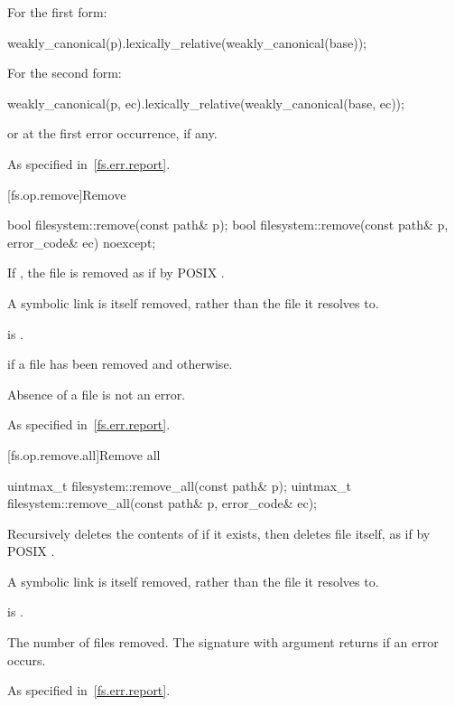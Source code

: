 \begin{itemdescr}
\pnum
\returns
For the first form:
\begin{codeblock}
weakly_canonical(p).lexically_relative(weakly_canonical(base));
\end{codeblock}
  For the second form:
\begin{codeblock}
weakly_canonical(p, ec).lexically_relative(weakly_canonical(base, ec));
\end{codeblock}
  or  at the first error occurrence, if any.

\pnum
\throws
As specified in~\ref{fs.err.report}.
\end{itemdescr}

[fs.op.remove]{Remove}

%
\begin{itemdecl}
bool filesystem::remove(const path& p);
bool filesystem::remove(const path& p, error_code& ec) noexcept;
\end{itemdecl}

\begin{itemdescr}
\pnum
\effects
If , the file  is
  removed as if by POSIX .
\begin{note}
A symbolic link is itself removed, rather than the file it
  resolves to.
\end{note}

\pnum
\ensures
{} is .

\pnum
\returns
{} if a file  has been removed and  otherwise.
\begin{note}
Absence of a file  is not an error.
\end{note}

\pnum
\throws
As specified in~\ref{fs.err.report}.
\end{itemdescr}


[fs.op.remove.all]{Remove all}

%
\begin{itemdecl}
uintmax_t filesystem::remove_all(const path& p);
uintmax_t filesystem::remove_all(const path& p, error_code& ec);
\end{itemdecl}

\begin{itemdescr}
\pnum
\effects
Recursively deletes the contents of  if it exists,
  then deletes file  itself, as if by POSIX .
\begin{note}
A symbolic link is itself removed, rather than the file it
  resolves to.
\end{note}

\pnum
\ensures
{} is .

\pnum
\returns
The number of files removed. The signature with argument
   returns  if an error
  occurs.

\pnum
\throws
As specified in~\ref{fs.err.report}.
\end{itemdescr}


